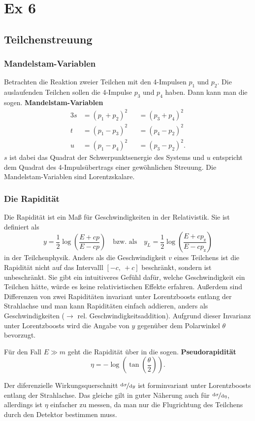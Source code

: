 \chapter{Ex 6}

\section{Teilchenstreuung}

\subsection{Mandelstam-Variablen}
Betrachten die Reaktion zweier Teilchen mit den 4-Impulsen $p_1$ und $p_2$. Die auslaufenden Teilchen sollen die 4-Impulse $p_3$ und $p_4$ haben.
Dann kann man die sogen. \textbf{Mandelstam-Variablen}
\begin{alignat*}{3}
	s &= \left(p_1 + p_2 \right)^2 &&= \left(p_3 + p_4 \right)^2 \\
	t &= \left(p_1 - p_3 \right)^2 &&= \left(p_4 - p_2 \right)^2 \\
	u &= \left(p_1 - p_4 \right)^2 &&= \left(p_3 - p_2 \right)^2.
\end{alignat*}
$s$ ist dabei das Quadrat der Schwerpunktsenergie des Systems und $u$ entspricht dem Quadrat des 4-Impulsübertrags einer gewöhnlichen Streuung.
Die Mandelstam-Variablen sind Lorentzskalare.

\subsection{Die Rapidität}
Die Rapidität ist ein Maß für Geschwindigkeiten in der Relativistik.
Sie ist definiert als
\begin{equation*}
	y = \frac{1}{2}\log\left(\frac{E+cp}{E-cp}\right)\quad \text{bzw. als}\quad y_L=\frac{1}{2}\log\left(\frac{E+cp_\text{z}}{E-cp_\text{z}}\right)
\end{equation*}
in der Teilchenphysik.
Anders als die Geschwindigkeit $v$ eines Teilchens ist die Rapidität nicht auf das Intervalll $[-c,\ +c]$ beschränkt, sondern ist unbeschränkt.
Sie gibt ein intuitiveres Gefühl dafür, welche Geschwindigkeit ein Teilchen hätte, würde es keine relativistischen Effekte erfahren.
Außerdem sind Differenzen von zwei Rapiditäten invariant unter Lorentzboosts entlang der Strahlachse und man kann Rapiditäten einfach addieren, anders als Geschwindigkeiten ($\rightarrow$ rel. Geschwindigkeitsaddition).
Aufgrund dieser Invarianz unter Lorentzboosts wird die Angabe von $y$ gegenüber dem Polarwinkel $\theta$ bevorzugt.

Für den Fall $E\gg m$ geht die Rapidität über in die sogen. \textbf{Pseudorapidität}
\begin{equation*}
	\eta = -\log\left(\tan\left(\frac{\theta}{2}\right)\right).
\end{equation*}

Der diferenzielle Wirkungsquerschnitt $\nicefrac{\text{d}\sigma}{\text{d}y}$ ist forminvariant unter Lorentzboosts entlang der Strahlachse.
Das gleiche gilt in guter Näherung auch für $\nicefrac{\text{d}\sigma}{\text{d}\eta}$, allerdings ist $\eta$ einfacher zu messen, da man nur die Flugrichtung des Teilchens durch den Detektor bestimmen muss.

